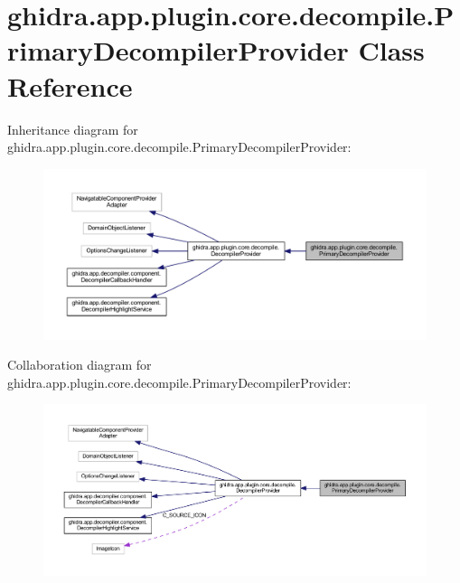 \hypertarget{classghidra_1_1app_1_1plugin_1_1core_1_1decompile_1_1_primary_decompiler_provider}{}\section{ghidra.\+app.\+plugin.\+core.\+decompile.\+Primary\+Decompiler\+Provider Class Reference}
\label{classghidra_1_1app_1_1plugin_1_1core_1_1decompile_1_1_primary_decompiler_provider}


Inheritance diagram for ghidra.\+app.\+plugin.\+core.\+decompile.\+Primary\+Decompiler\+Provider\+:
\nopagebreak
\begin{figure}[H]
\begin{center}
\leavevmode
\includegraphics[width=350pt]{classghidra_1_1app_1_1plugin_1_1core_1_1decompile_1_1_primary_decompiler_provider__inherit__graph}
\end{center}
\end{figure}


Collaboration diagram for ghidra.\+app.\+plugin.\+core.\+decompile.\+Primary\+Decompiler\+Provider\+:
\nopagebreak
\begin{figure}[H]
\begin{center}
\leavevmode
\includegraphics[width=350pt]{classghidra_1_1app_1_1plugin_1_1core_1_1decompile_1_1_primary_decompiler_provider__coll__graph}
\end{center}
\end{figure}
